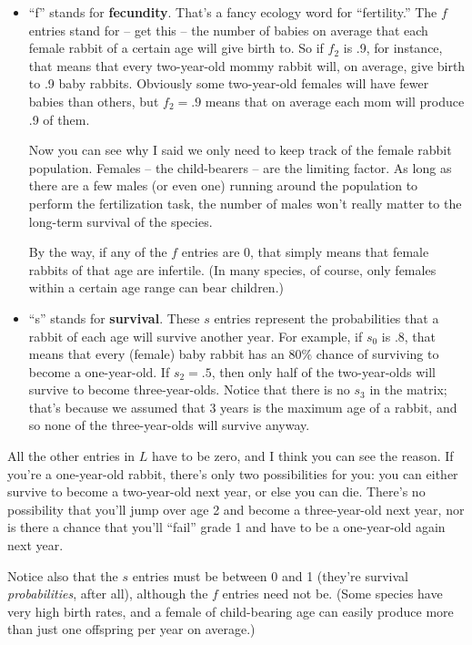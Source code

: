 \begin{itemize}
\itemsep.1em


\item ``f'' stands for \textbf{fecundity}. That's a fancy ecology word for
``fertility.'' The $f$ entries stand for -- get this -- the number of babies on
average that each female rabbit of a certain age will give birth to. So if
$f_2$ is .9, for instance, that means that every two-year-old mommy rabbit
will, on average, give birth to .9 baby rabbits. Obviously some two-year-old
females will have fewer babies than others, but $f_2=.9$ means that on average
each mom will produce .9 of them.

Now you can see why I said we only need to keep track of the female rabbit
population. Females -- the child-bearers -- are the limiting factor. As long as
there are a few males (or even one) running around the population to perform
the fertilization task, the number of males won't really matter to the
long-term survival of the species.

By the way, if any of the $f$ entries are 0, that simply means that female
rabbits of that age are infertile. (In many species, of course, only females
within a certain age range can bear children.)


\item ``s'' stands for \textbf{survival}. These $s$ entries represent the
probabilities that a rabbit of each age will survive another year. For example,
if $s_0$ is .8, that means that every (female) baby rabbit has an 80\% chance
of surviving to become a one-year-old. If $s_2=.5$, then only half of the
two-year-olds will survive to become three-year-olds. Notice that there is no
$s_3$ in the matrix; that's because we assumed that 3 years is the maximum age
of a rabbit, and so none of the three-year-olds will survive anyway.

\end{itemize}

All the other entries in $L$ have to be zero, and I think you can see the
reason. If you're a one-year-old rabbit, there's only two possibilities for
you: you can either survive to become a two-year-old next year, or else you can
die. There's no possibility that you'll jump over age 2 and become a
three-year-old next year, nor is there a chance that you'll ``fail'' grade 1
and have to be a one-year-old again next year.

Notice also that the $s$ entries must be between 0 and 1 (they're survival
\textit{probabilities}, after all), although the $f$ entries need not be. (Some
species have very high birth rates, and a female of child-bearing age can
easily produce more than just one offspring per year on average.)

